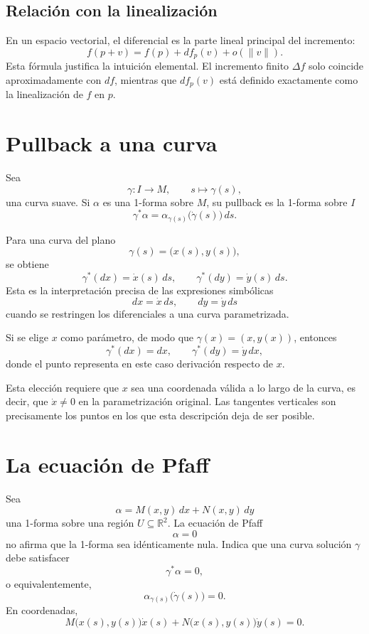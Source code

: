 \documentclass[12pt,a4paper]{article}
\newcommand{\R}{\mathbb{R}}
\begin{document}
	\subsection{Relación con la linealización}

	En un espacio vectorial, el diferencial es la parte lineal principal del incremento:
	\[
	f(p+v)
	=
	f(p)+df_p(v)+o(\lVert v\rVert).
	\]
Esta fórmula justifica la intuición elemental. El incremento finito \(\Delta f\) solo coincide aproximadamente con \(df\), mientras que \(df_p(v)\) está definido exactamente como la linealización de \(f\) en \(p\).

	\clearpage
	\section{Pullback a una curva}

	Sea
	\[
	\gamma\colon I\longrightarrow M,
	\qquad
	s\longmapsto \gamma(s),
	\]
una curva suave. Si \(\alpha\) es una 1-forma sobre \(M\), su pullback es la 1-forma sobre \(I\)
	\[
	\gamma^*\alpha
	=
	\alpha_{\gamma(s)}\bigl(\dot{\gamma}(s)\bigr)\,ds.
	\]

	Para una curva del plano
	\[
	\gamma(s)=\bigl(x(s),y(s)\bigr),
	\]
se obtiene
	\[
	\gamma^*(dx)=\dot{x}(s)\,ds,
	\qquad
	\gamma^*(dy)=\dot{y}(s)\,ds.
	\]
Esta es la interpretación precisa de las expresiones simbólicas
	\[
	dx=\dot{x}\,ds,
	\qquad
	dy=\dot{y}\,ds
	\]
cuando se restringen los diferenciales a una curva parametrizada.

	Si se elige \(x\) como parámetro, de modo que \(\gamma(x)=(x,y(x))\), entonces
	\[
	\gamma^*(dx)=dx,
	\qquad
	\gamma^*(dy)=\dot{y}\,dx,
	\]
donde el punto representa en este caso derivación respecto de \(x\).

	Esta elección requiere que \(x\) sea una coordenada válida a lo largo de la curva, es decir, que \(\dot{x}\neq 0\) en la parametrización original. Las tangentes verticales son precisamente los puntos en los que esta descripción deja de ser posible.

	\clearpage
	\section{La ecuación de Pfaff}

	Sea
	\[
	\alpha
	=
	M(x,y)\,dx+N(x,y)\,dy
	\]
una 1-forma sobre una región \(U\subseteq\R^2\). La ecuación de Pfaff
	\[
	\alpha=0
	\]
no afirma que la 1-forma sea idénticamente nula. Indica que una curva solución \(\gamma\) debe satisfacer
	\[
	\gamma^*\alpha=0,
	\]
o equivalentemente,
	\[
	\alpha_{\gamma(s)}\bigl(\dot{\gamma}(s)\bigr)=0.
	\]
En coordenadas,
	\[
	M\bigl(x(s),y(s)\bigr)\dot{x}(s)
	+
	N\bigl(x(s),y(s)\bigr)\dot{y}(s)
	=0.
	\]
\end{document}
